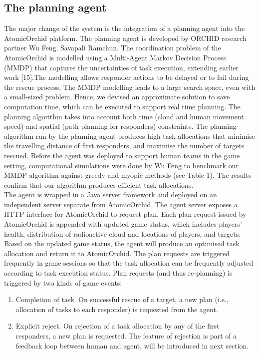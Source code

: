 \subsection{The planning agent}
The major change of the system is the integration of a planning agent into the AtomicOrchid platform. The planning agent is developed by ORCHID research partner Wu Feng, Savapali Ramchun. The coordination problem of the AtomicOrchid is modelled using a Multi-Agent Markov Decision Process (MMDP) that captures the uncertainties of task execution, extending earlier work [15].The modelling allows responder actions to be delayed or to fail during the rescue process. The MMDP modelling leads to a large search space, even with a small-sized problem. Hence, we devised an approximate solution to save computation time, which can be executed to support real time planning. The planning algorithm takes into account both time (cloud and human movement speed) and spatial (path planning for responders) constraints. The planning algorithm run by the planning agent produces high task allocations that minimise the travelling distance of first responders, and maximise the number of targets rescued. Before the agent was deployed to support human teams in the game setting, computational simulations were done by Wu Feng to benchmark our MMDP algorithm against greedy and myopic methods (see Table 1). The results confirm that our algorithm produces efficient task allocations.\\

The agent is wrapped in a Java server framework and deployed on an independent server separate from AtomicOrchid. The agent server exposes a HTTP interface for AtomicOrchid to request plan. Each plan request issued by AtomicOrchid is appended with  updated game status, which includes players' health, distribution of radioactive cloud and locations of players, and targets. Based on the updated game status, the agent will produce an optimised task allocation and return it to AtomicOrchid. The plan requests are triggered frequently in game sessions so that the task allocation can be frequently adjusted according to task execution status. Plan requests (and thus re-planning) is triggered by two kinds of game events:\\


\begin{enumerate}
\item Completion of task. On successful rescue of a target, a new plan (i.e., allocation of tasks to each responder) is requested from the agent.\\

\item Explicit reject. On rejection of a task allocation by any of the first responders, a new plan is requested.  The feature of rejection is part of a feedback loop between human and agent, will be introduced in next section.\\

\end{enumerate}


